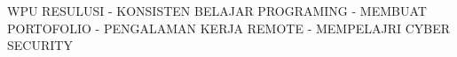WPU RESULUSI
- KONSISTEN BELAJAR PROGRAMING
- MEMBUAT PORTOFOLIO
- PENGALAMAN KERJA REMOTE
- MEMPELAJRI CYBER SECURITY
